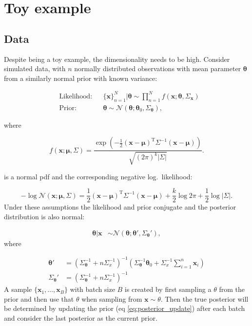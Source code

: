 \section{Toy example}

\subsection{Data}

Despite being a toy example, the dimensionality needs to be high. Consider simulated data, with $n$ normally distributed observations with mean parameter $\bm{\theta}$ from a similarly normal prior with known variance:

\begin{align}
  &\text{Likelihood:} &&\{\bm{x}\}_{n=1}^N | \bm{\theta} \sim \prod_{n=1}^N f(\bm{x}; \bm{\theta}, \Sigma_{\bm{x}})  \nonumber \\
  &\text{Prior:} &&\bm{\theta} \sim \mathcal{N}(\bm{\theta}; \bm{\theta}_0, \Sigma_{\bm{\theta}}),
\end{align}

where

\begin{equation}
  f \left( \bm{x}; \bm{\mu}, \Sigma \right) = \frac{ \exp \left( -\frac{ 1 }{ 2 } ( \bm {x} - \bm{\mu} )^{ \mathrm {T} }{ \Sigma }^{-1} ( \bm{x} - \bm{\mu} ) \right)} { \sqrt{ ( 2\pi )^{k} | \Sigma | } }.
\end{equation}

is a normal pdf and the corresponding negative log.\ likelihood:

\begin{equation}
  -\log \mathcal{N} \left( \bm{x}; \bm{\mu}, \Sigma \right) = \frac{ 1 }{ 2 } ( \bm {x} - \bm{\mu} )^{ \mathrm {T} }{ \Sigma }^{-1} ( \bm{x} - \bm{\mu} ) + \frac{k}{2} \log 2\pi  + \frac{1}{2} \log | \Sigma | .
\end{equation}
Under these assumptions the likelihood and prior conjugate and the posterior distribution is also normal:

\begin{align}
  \bm{\theta}|\bm{x} &\sim \mathcal{N}(\bm{\theta}; \bm{\theta}', \Sigma_{\bm{\theta}}') \nonumber,
\end{align}
where

\begin{align}
  \bm{\theta}' &= \left( \Sigma_{\bm{\theta}}^{-1} + n \Sigma_x^{-1}\right)^{-1} \left( \Sigma_{\bm{\theta}}^{-1} \bm{\theta}_{0} + \Sigma_x^{-1} \sum_{i=1}^{n} \bm{x}_{i} \right) \nonumber \\
  \Sigma_{\bm{\theta}}' &=\left( \Sigma_{\bm{\theta}}^{-1} + n \Sigma_x^{-1}\right)^{-1}
  \label{eq:posterior_update}
\end{align}
A sample $\{\bm{x}_1, \dots, \bm{x}_B \}$ with batch size $B$ is created by first sampling a $\theta$ from the prior and then use that $\theta$ when sampling from $ \bm{x} \sim \theta $.
Then the true posterior will be determined by updating the prior (eq \eqref{eq:posterior_update}) after each batch and consider the last posterior as the current prior.

